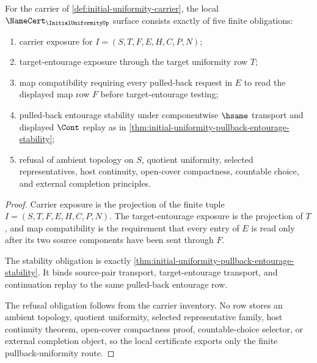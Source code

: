 \begin{theorem}
\label{thm:initial-uniformity-namecert-obligations}
For the carrier of \autoref{def:initial-uniformity-carrier}, the local $\NameCert_{\InitialUniformityUp}$ surface consists exactly of five finite obligations:
\begin{enumerate}
\item carrier exposure for $I=(S,T,F,E,H,C,P,N)$;
\item target-entourage exposure through the target uniformity row $T$;
\item map compatibility requiring every pulled-back request in $E$ to read the displayed map row $F$ before target-entourage testing;
\item pulled-back entourage stability under componentwise $\hsame$ transport and displayed $\Cont$ replay as in \autoref{thm:initial-uniformity-pullback-entourage-stability};
\item refusal of ambient topology on $S$, quotient uniformity, selected representatives, host continuity, open-cover compactness, countable choice, and external completion principles.
\end{enumerate}
\end{theorem}
\begin{proof}
Carrier exposure is the projection of the finite tuple $I=(S,T,F,E,H,C,P,N)$. The target-entourage exposure is the projection of $T$, and map compatibility is the requirement that every entry of $E$ is read only after its two source components have been sent through $F$.

The stability obligation is exactly \autoref{thm:initial-uniformity-pullback-entourage-stability}. It binds source-pair transport, target-entourage transport, and continuation replay to the same pulled-back entourage row.

The refusal obligation follows from the carrier inventory. No row stores an ambient topology, quotient uniformity, selected representative family, host continuity theorem, open-cover compactness proof, countable-choice selector, or external completion object, so the local certificate exports only the finite pullback-uniformity route.
\end{proof}


